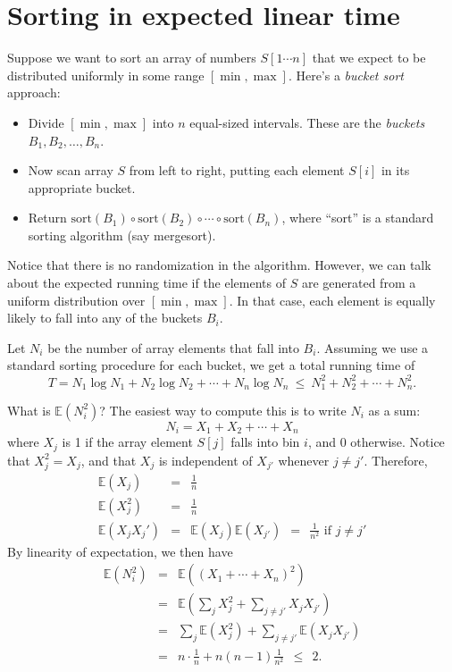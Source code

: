 \documentclass{report}
\theoremstyle{plain}
\theoremstyle{definition}
\newcommand{\E}{\mathbb{E}}
\begin{document}
\section{Sorting in expected linear time}
\label{sec:sorting}
Suppose we want to sort an array of numbers $S[1\cdots n]$ that we expect to be
distributed uniformly in some range $[\min,\max]$. Here's a {\it bucket sort} approach:
\begin{itemize}
\item Divide $[\min,\max]$ into $n$ equal-sized intervals. These are the {\it buckets} 
$B_1, B_2, \ldots, B_n$.
\item Now scan array $S$ from left to right, putting each element $S[i]$ in its
appropriate bucket.
\item Return $\mbox{sort}(B_1) \circ \mbox{sort}(B_2) \circ \cdots \circ \mbox{sort}(B_n)$,
where ``sort'' is a standard sorting algorithm (say mergesort).
\end{itemize}

Notice that there is no randomization in the algorithm. However, we can talk about
the expected running time if the elements of $S$ are generated from a uniform 
distribution over $[\min,\max]$. In that case, each element is equally likely to 
fall into any of the buckets $B_i$.

Let $N_i$ be the number of array elements that fall into $B_i$. Assuming
we use a standard sorting procedure for each bucket, we get a total running time of
$$ T = N_1 \log N_1 + N_2 \log N_2 + \cdots + N_n \log N_n \ \leq \ 
N_1^2 + N_2^2 + \cdots + N_n^2 .$$

What is $\E(N_i^2)$? The easiest way to compute this is to write $N_i$ as a sum:
$$ N_i = X_1 + X_2 + \cdots + X_n$$
where $X_j$ is 1 if the array element $S[j]$ falls into bin $i$, and 0 otherwise.
Notice that $X_j^2 = X_j$, and that $X_j$ is independent of $X_{j'}$ whenever $j \neq j'$.
Therefore,
\begin{eqnarray*}
\E(X_j)  &  = & \frac{1}{n} \\
\E(X_j^2) & = & \frac{1}{n} \\
\E(X_jX_j') & = & \E(X_j) \E(X_{j'}) \ \ = \ \ \frac{1}{n^2} \mbox{\ \ \ \ if $j \neq j'$}
\end{eqnarray*}
By linearity of expectation, we then have
\begin{eqnarray*}
\E(N_i^2) 
& = & \E \left( (X_1 + \cdots + X_n)^2 \right) \\
& = & \E \left( \sum_j X_j^2 + \sum_{j \neq j'} X_j X_{j'} \right) \\
& = & \sum_j \E(X_j^2) + \sum_{j \neq j'} \E(X_j X_{j'}) \\
& = & n \cdot \frac{1}{n} + n(n-1) \frac{1}{n^2} \ \ \leq \ \ 2.
\end{eqnarray*}
\end{document}
